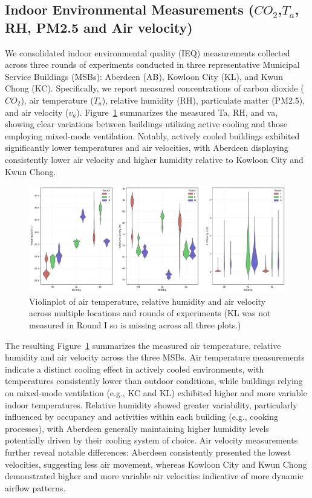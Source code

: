 \documentclass[preprint,12pt]{elsarticle}
\begin{document}
\subsection{Indoor Environmental Measurements ($CO_2$,$T_a$, RH, PM2.5 and Air velocity)}
We consolidated indoor environmental quality (IEQ) measurements collected across three rounds of experiments conducted in three representative Municipal Service Buildings (MSBs): Aberdeen (AB), Kowloon City (KL), and Kwun Chong (KC). Specifically, we report measured concentrations of carbon dioxide ($CO_2$), air temperature ($T_a$), relative humidity (RH), particulate matter (PM2.5), and air velocity ($v_a$). Figure~\ref{fig:TaRHva} summarizes the measured Ta, RH, and va, showing clear variations between buildings utilizing active cooling and those employing mixed-mode ventilation. Notably, actively cooled buildings exhibited significantly lower temperatures and air velocities, with Aberdeen displaying consistently lower air velocity and higher humidity relative to Kowloon City and Kwun Chong.


    \begin{figure}[h!]
        \centering
        \includegraphics[width=\linewidth]{img/TaRHva.png}
        \caption{Violinplot of air temperature, relative humidity and air velocity across multiple locations and rounds of experiments (KL was not measured in Round I so is missing across all three plots.)}
        \label{fig:TaRHva}
    \end{figure}

The resulting Figure~\ref{fig:TaRHva} summarizes the measured air temperature, relative humidity and air velocity across the three MSBs. Air temperature measurements indicate a distinct cooling effect in actively cooled environments, with temperatures consistently lower than outdoor conditions, while buildings relying on mixed-mode ventilation (e.g., KC and KL) exhibited higher and more variable indoor temperatures. Relative humidity showed greater variability, particularly influenced by occupancy and activities within each building (e.g., cooking processes), with Aberdeen generally maintaining higher humidity levels potentially driven by their cooling system of choice. Air velocity measurements further reveal notable differences: Aberdeen consistently presented the lowest velocities, suggesting less air movement, whereas Kowloon City and Kwun Chong demonstrated higher and more variable air velocities indicative of more dynamic airflow patterns.
\end{document}
